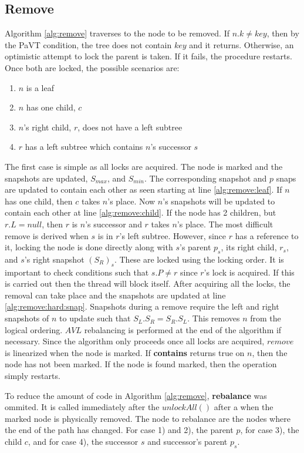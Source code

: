 \documentclass[conference]{IEEEtran}
\theoremstyle{definition}
\theoremstyle{theorem}
\begin{document}
\subsection{Remove}
Algorithm \ref{alg:remove} traverses to the node to be removed. If $n.k\neq key$, then by the PaVT condition, the tree does not contain $key$ and it returns. Otherwise, an optimistic attempt to lock the parent is taken. If it fails, the procedure restarts. Once both are locked, the possible scenarios are:
\begin{enumerate}
\item $n$ is a leaf
\item $n$ has one child, $c$
\item $n$'s right child, $r$, does not have a left subtree
\item $r$ has a left subtree which contains $n$'s successor $s$
\end{enumerate}
The first case is simple as all locks are acquired. The node is marked and the snapshots are updated, $S_{max}$, and $S_{min}$. The corresponding snapshot and $p$ snaps are updated to contain each other as seen starting at line \ref{alg:remove:leaf}. If $n$ has one child, then $c$ takes $n$'s place. Now $n$'s snapshots will be updated to contain each other at line \ref{alg:remove:child}. If the node has 2 children, but $r.L = null$, then $r$ is $n$'s successor and $r$ takes $n$'s place. The most difficult remove is derived when $s$ is in $r$'s left subtree. However, since $r$ has a reference to it, locking the node is done directly along with $s$'s parent $p_s$, its right child, $r_s$, and $s$'s right snapshot $(S_R)_s$. These are locked using the locking order. It is important to check conditions such that $s.P \neq r$ since $r$'s lock is acquired. If this is carried out then the thread will block itself. After acquiring all the locks, the removal can take place and the snapshots are updated at line \ref{alg:remove:hard:snap}. Snapshots during a remove require the left and right snapshots of $n$ to update such that $S_L.S_R = S_R.S_L$. This removes $n$ from the logical ordering. $AVL$ rebalancing is performed at the end of the algorithm if necessary. Since the algorithm only proceeds once all locks are acquired, $remove$ is linearized when the node is marked. If \textbf{contains} returns true on $n$, then the node has not been marked. If the node is found marked, then the operation simply restarts.

To reduce the amount of code in Algorithm \ref{alg:remove}, \textbf{rebalance} was ommited. It is called immediately after the $unlockAll()$ after a when the marked node is physically removed. The node to rebalance are the nodes where the end of the path has changed. For case 1) and 2), the parent $p$, for case 3), the child $c$, and for case 4), the successor $s$ and successor's parent $p_s$.
\end{document}
